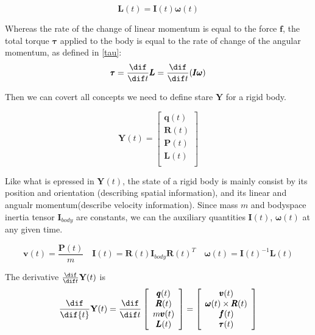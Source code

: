 \begin{equation}
    \pmb{L}(t) = \pmb{I}(t)\pmb{\omega}(t)
    \label{am}
\end{equation}

Whereas the rate of the change of linear momentum is equal to the force $\pmb{f}$, the total torque $\pmb{\tau}$ applied to the body is equal to the rate of change of the angular momentum, as defined in \ref{tau}:
\begin{equation}
    \pmb{\tau} = \frac{\dif}{\dif t }\pmb{L} = \frac{\dif}{\dif t }(\pmb{I}\pmb{\omega})
    \label{tau}
\end{equation}

 Then we can covert all concepts we need to define stare $\textbf{Y}$ for a rigid body.

\begin{equation}
    \textbf{Y}(t) = \left[
        \begin{array}{c}
            \pmb{q}(t) \\
            \pmb{R}(t) \\
            \pmb{P}(t) \\
            \pmb{L}(t) \\
        \end{array}
    \right]
\end{equation}

Like what is epressed in $\textbf{Y}(t)$, the state of a rigid body is mainly consist by its position and orientation (describing spatial information), and its linear and angualr momentum(describe velocity information). Since mass $m$ and bodyspace inertia tensor $\pmb{I}_{body}$ are constants, we can the auxiliary quantities $\pmb{I}(t)$, $\pmb{\omega}(t)$ at any given time.

\begin{equation}
    \pmb{v}(t) = \frac{\pmb{P}(t)}{m} \quad
    \pmb{I}(t) = \pmb{R}(t)\pmb{I}_{body}\pmb{R}(t)^{T} \quad
    \pmb{\omega}(t) = \pmb{I}(t)^{-1}\pmb{L}(t)
\end{equation}

The derivative $\frac{\dif}{\dif t}\textbf{Y}(t)$ is
\begin{equation}
    \frac{\dif}{\dif{t}}\textbf{Y}(t) = \frac{\dif}{\dif t}\left[
        \begin{array}{c}
            \pmb{q}(t) \\
            \pmb{R}(t) \\
            m \pmb{v}(t) \\
            \pmb{L}(t) \\
        \end{array}
    \right] = \left[
        \begin{array}{c}
            \pmb{v}(t) \\
            \pmb{\omega}(t)\times\pmb{R}(t) \\
            \pmb{f}(t) \\
            \pmb{\tau}(t) \\
        \end{array}
    \right]
\end{equation}

